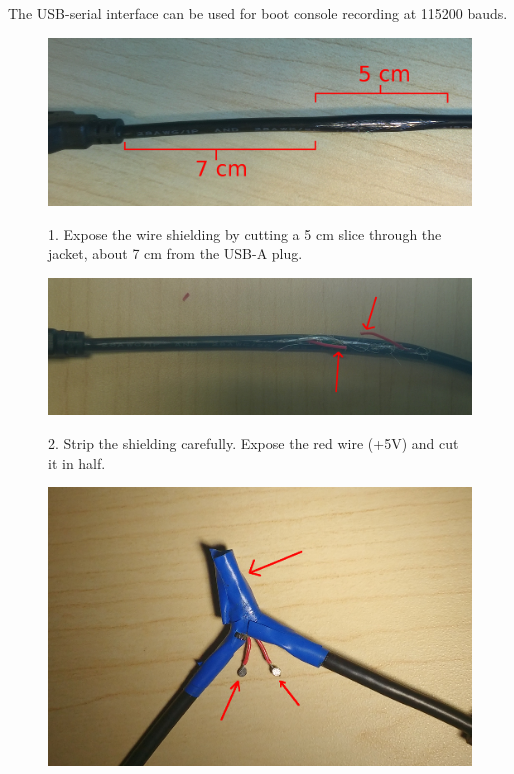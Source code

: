 \documentclass[a4paper,11pt]{article}
\begin{document}
The USB-serial interface can be used for boot console recording at 115200 bauds.
\begin{figure}
	\centering
	\begin{minipage}[c][0.5\textheight][t]{0.49\textwidth}
	\centering
	\includegraphics[width=\linewidth]{edisonwire1.jpg}
	
	1. Expose the wire shielding by cutting a 5 cm slice through the jacket, about 7 cm from the USB-A plug.
	\end{minipage}
	\begin{minipage}[c][0.5\textheight][t]{0.49\textwidth}
	\centering
	\includegraphics[width=\linewidth]{edisonwire2.jpg}
	
	2. Strip the shielding carefully.	
	Expose the red wire (+5V) and cut it in half.
	\end{minipage}
	\begin{minipage}[c][0.5\textheight][t]{0.49\textwidth}
	\centering
	\includegraphics[width=\linewidth]{edisonwire3.jpg}
	

\end{minipage}
\end{figure}
\end{document}
